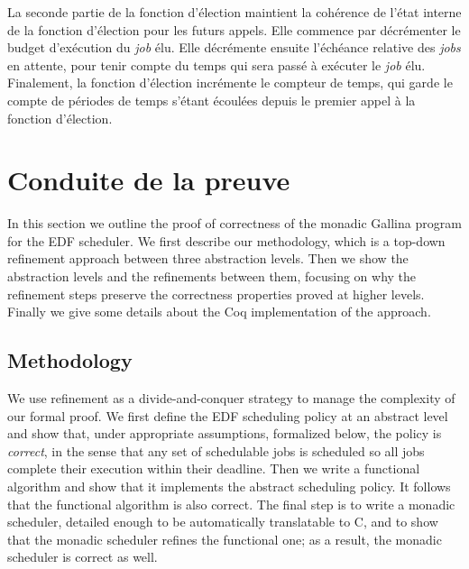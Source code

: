 		La seconde partie de la fonction d'élection maintient la cohérence de l'état interne de la fonction d'élection pour les futurs appels. Elle commence par décrémenter le budget d'exécution du \emph{job} élu. Elle décrémente ensuite l'échéance relative des \emph{jobs} en attente, pour tenir compte du temps qui sera passé à exécuter le \emph{job} élu. Finalement, la fonction d'élection incrémente le compteur de temps, qui garde le compte de périodes de temps s'étant écoulées depuis le premier appel à la fonction d'élection.

	\section{Conduite de la preuve}

	\label{sec:proof}
	In this section we outline the proof of correctness of the monadic Gallina program for the EDF scheduler.
	We first describe our methodology, which is a top-down refinement approach between three abstraction levels. Then we show the abstraction levels and the refinements between them, focusing on why the refinement steps preserve the correctness properties proved at higher levels. Finally we give some details about the Coq implementation of the approach.


	\subsection{Methodology}

	We use refinement %
	as a divide-and-conquer strategy to manage the complexity of our formal proof.
	We first define the EDF scheduling policy at an abstract level and show that,
	under appropriate assumptions, formalized below, the policy is \emph{correct},
	in the sense that any set of schedulable jobs is scheduled so all jobs complete
	their execution within their deadline. Then we write a functional algorithm and
	show that it implements the abstract scheduling policy. It follows that the functional
	algorithm is also correct. The final step is to write a monadic scheduler,
	detailed enough to be automatically translatable to C, and to show that
	the monadic scheduler refines the functional one; as a result, the monadic scheduler is correct as well.

